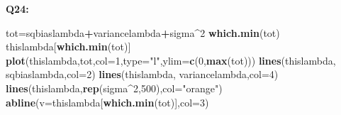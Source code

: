 \documentclass[]{article}
\newenvironment{Shaded}{\begin{snugshade}}{\end{snugshade}}
\newcommand{\KeywordTok}[1]{\textcolor[rgb]{0.13,0.29,0.53}{\textbf{#1}}}
\newcommand{\DataTypeTok}[1]{\textcolor[rgb]{0.13,0.29,0.53}{#1}}
\newcommand{\DecValTok}[1]{\textcolor[rgb]{0.00,0.00,0.81}{#1}}
\newcommand{\StringTok}[1]{\textcolor[rgb]{0.31,0.60,0.02}{#1}}
\newcommand{\OperatorTok}[1]{\textcolor[rgb]{0.81,0.36,0.00}{\textbf{#1}}}
\newcommand{\NormalTok}[1]{#1}
\begin{document}
\textbf{Q24:}

\begin{Shaded}
\begin{Highlighting}[]
\NormalTok{tot=sqbiaslambda}\OperatorTok{+}\NormalTok{variancelambda}\OperatorTok{+}\NormalTok{sigma}\OperatorTok{^}\DecValTok{2}
\KeywordTok{which.min}\NormalTok{(tot)}
\NormalTok{thislambda[}\KeywordTok{which.min}\NormalTok{(tot)]}
\KeywordTok{plot}\NormalTok{(thislambda,tot,}\DataTypeTok{col=}\DecValTok{1}\NormalTok{,}\DataTypeTok{type=}\StringTok{"l"}\NormalTok{,}\DataTypeTok{ylim=}\KeywordTok{c}\NormalTok{(}\DecValTok{0}\NormalTok{,}\KeywordTok{max}\NormalTok{(tot)))}
\KeywordTok{lines}\NormalTok{(thislambda, sqbiaslambda,}\DataTypeTok{col=}\DecValTok{2}\NormalTok{)}
\KeywordTok{lines}\NormalTok{(thislambda, variancelambda,}\DataTypeTok{col=}\DecValTok{4}\NormalTok{)}
\KeywordTok{lines}\NormalTok{(thislambda,}\KeywordTok{rep}\NormalTok{(sigma}\OperatorTok{^}\DecValTok{2}\NormalTok{,}\DecValTok{500}\NormalTok{),}\DataTypeTok{col=}\StringTok{"orange"}\NormalTok{)}
\KeywordTok{abline}\NormalTok{(}\DataTypeTok{v=}\NormalTok{thislambda[}\KeywordTok{which.min}\NormalTok{(tot)],}\DataTypeTok{col=}\DecValTok{3}\NormalTok{)}
\end{Highlighting}
\end{Shaded}
\end{document}
